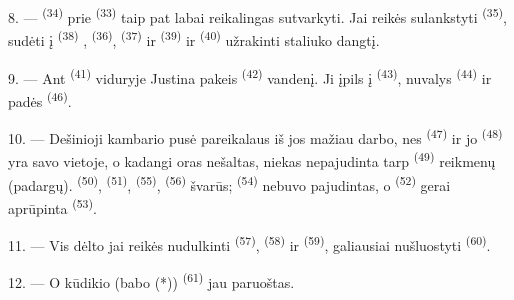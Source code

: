 \VUsaut{5.0mm}
\VUsaut{3.0mm}

8. ---  \textsuperscript{(34)} prie 
\textsuperscript{(33)} taip pat labai reikalingas sutvarkyti. Jai reikės sulankstyti
 \textsuperscript{(35)}, sudėti į 
\textsuperscript{(38)} ,  \textsuperscript{(36)},
 \textsuperscript{(37)} ir  \textsuperscript{(39)} ir
 \textsuperscript{(40)} užrakinti staliuko dangtį.

9. --- Ant  \textsuperscript{(41)} viduryje Justina
pakeis  \textsuperscript{(42)} vandenį. Ji įpils  į
 \textsuperscript{(43)}, nuvalys 
\textsuperscript{(44)} ir padės  \textsuperscript{(46)}.

10. --- Dešinioji kambario pusė pareikalaus iš jos mažiau darbo, nes  \textsuperscript{(47)} ir jo  \textsuperscript{(48)} yra savo
vietoje, o kadangi oras nešaltas, niekas nepajudinta tarp 
\textsuperscript{(49)} reikmenų (padargų). 
\textsuperscript{(50)},  \textsuperscript{(51)}, 
\textsuperscript{(55)},  \textsuperscript{(56)} švarūs;
 \textsuperscript{(54)} nebuvo pajudintas, o 
\textsuperscript{(52)} gerai aprūpinta  \textsuperscript{(53)}.



11. --- Vis dėlto jai reikės nudulkinti 
\textsuperscript{(57)},  \textsuperscript{(58)} ir  \textsuperscript{(59)}, galiausiai nušluostyti 
\textsuperscript{(60)}.

12. --- O kūdikio (babo (*))  \textsuperscript{(61)} jau paruoštas.

